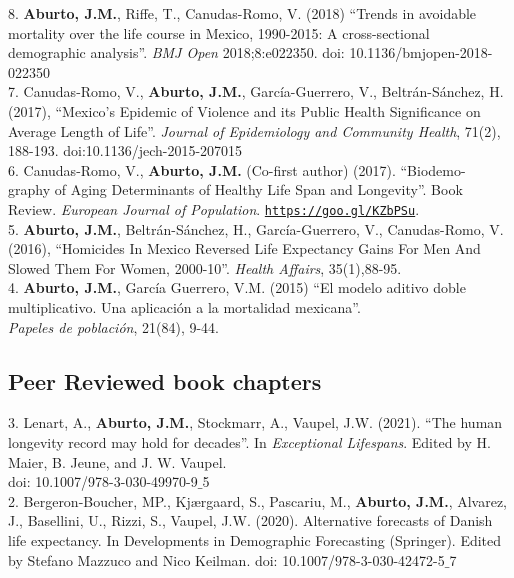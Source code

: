 \documentclass[12pt]{article}
\providecommand*\url[1]{\href{#1}{#1}}
\renewcommand*\url[1]{\href{#1}{\texttt{#1}}}
\begin{document}
8. \textbf{Aburto, J.M.}, Riffe, T., Canudas-Romo, V. (2018) ``Trends in avoidable mortality over the life course in Mexico, 1990-2015:  A cross-sectional demographic analysis''. \emph{BMJ Open} 2018;8:e022350. doi: 10.1136/bmjopen-2018-022350 \\

7. Canudas-Romo, V.,  \textbf{Aburto, J.M.}, Garc\'ia-Guerrero, V., Beltr\'an-S\'anchez, H. (2017),  ``Mexico's Epidemic of Violence and its Public Health Significance on Average Length of Life''. \emph{Journal of Epidemiology and Community Health}, 71(2), 188-193. doi:10.1136/jech-2015-207015 \\ 
  
6. Canudas-Romo, V.,  \textbf{Aburto, J.M.} (Co-first author) (2017). ``Biodemo- \\ graphy of Aging Determinants of Healthy Life Span and Longevity''. Book Review. \emph{European Journal of Population}. \url{https://goo.gl/KZbPSu}. \\ 
	 
5. \textbf{Aburto, J.M.}, Beltr\'an-S\'anchez, H., Garc\'ia-Guerrero, V., Canudas-Romo, V. (2016), ``Homicides In Mexico Reversed Life Expectancy Gains For Men And Slowed Them For Women, 2000-10''. \emph{Health Affairs}, 35(1),88-95. \\ 
		     
4. \textbf{Aburto, J.M.}, Garc\'ia Guerrero, V.M. (2015) ``El modelo aditivo doble multiplicativo. Una aplicaci\'on a la mortalidad mexicana''.\\  \emph{Papeles de poblaci\'on}, 21(84), 9-44. \\
		  
\subsection*{Peer Reviewed book chapters}

3. Lenart, A., \textbf{Aburto, J.M.}, Stockmarr, A., Vaupel, J.W. (2021). ``The human longevity record may hold for decades''. In \emph{Exceptional Lifespans}. Edited by H. Maier, B. Jeune, and J. W. Vaupel. \\
doi: 10.1007/978-3-030-49970-9$\_$5 \\ 

2. Bergeron-Boucher, MP., Kj{\ae}rgaard, S.,  Pascariu, M., \textbf{Aburto, J.M.},  Alvarez, J., Basellini, U.,  Rizzi, S., Vaupel, J.W. (2020). Alternative forecasts of Danish life expectancy. In Developments in Demographic Forecasting (Springer). Edited by Stefano Mazzuco and Nico Keilman. doi: 10.1007/978-3-030-42472-5$\_$7\\
\end{document}
